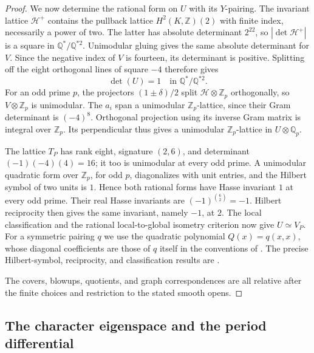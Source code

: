 \documentclass[11pt]{amsart}
\newcommand{\Q}{\mathbb Q}
\newcommand{\Z}{\mathbb Z}
\theoremstyle{definition}
\theoremstyle{remark}
\numberwithin{equation}{section}
\begin{document}
\begin{proof}
We now determine the rational form on $U$ with its $Y$-pairing.
The invariant lattice
$\mathcal H^+$ contains the pullback lattice $H^2(K,\Z)(2)$ with
finite index, necessarily a power of two.  The latter has absolute
determinant $2^{22}$, so
$|\det\mathcal H^+|$ is a square in $\Q^*/\Q^{*2}$.
Unimodular gluing gives the same absolute determinant for $V$.
Since the negative index of $V$ is fourteen, its determinant is
positive.  Splitting off the eight orthogonal lines of square $-4$
therefore gives
\[
 \det(U)=1\quad\text{in }\Q^*/\Q^{*2}.
\]
For an odd prime $p$, the projectors $(1\pm\delta)/2$ split
$\mathcal H\otimes\Z_p$ orthogonally, so $V\otimes\Z_p$ is
unimodular.  The $a_i$ span a unimodular $\Z_p$-lattice, since their
Gram determinant is $(-4)^8$.  Orthogonal projection using its
inverse Gram matrix is integral over $\Z_p$.  Its perpendicular
thus gives a unimodular $\Z_p$-lattice in $U\otimes\Q_p$.

The lattice $T_P$ has rank eight, signature $(2,6)$, and determinant
$(-1)(-4)(4)=16$; it too is unimodular at every odd prime.
A unimodular quadratic form over $\Z_p$, for odd $p$, diagonalizes
with unit entries, and the Hilbert symbol of two units is $1$.
Hence both rational forms have Hasse invariant $1$ at every odd
prime.  Their real Hasse invariants are
$(-1)^{\binom62}=-1$.  Hilbert reciprocity then gives the same
invariant, namely $-1$, at $2$.  The local classification and the
rational local-to-global isometry criterion now give
$U\simeq V_P$.  For a symmetric pairing $q$ we use the quadratic
polynomial $Q(x)=q(x,x)$, whose diagonal coefficients are those of
$q$ itself in the conventions of
\cite[Equations~(3.1)--(3.2)]{PetersSterk}.  The precise Hilbert-symbol,
reciprocity, and classification results are
\cite[Theorems~A.4.4, A.4.6, 3.3.1, and~3.3.5]{PetersSterk}.

The covers, blowups, quotients, and graph correspondences are all
relative after the finite choices and restriction to the stated
smooth opens.
\end{proof}

\subsection{The character eigenspace and the period differential}
\end{document}
